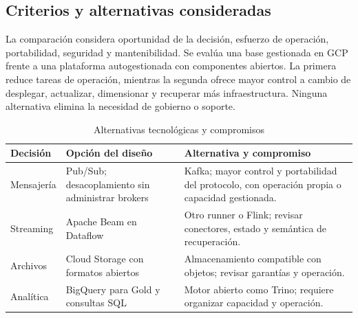 \documentclass[11pt,a4paper]{article}
\begin{document}
\subsection{Criterios y alternativas consideradas}
La comparación considera oportunidad de la decisión, esfuerzo de operación, portabilidad, seguridad y mantenibilidad. Se evalúa una base gestionada en GCP frente a una plataforma autogestionada con componentes abiertos. La primera reduce tareas de operación, mientras la segunda ofrece mayor control a cambio de desplegar, actualizar, dimensionar y recuperar más infraestructura. Ninguna alternativa elimina la necesidad de gobierno o soporte.
\begin{table}[H]
\caption{Alternativas tecnológicas y compromisos}\label{tab:alternativas}
\small\begin{tabularx}{\linewidth}{@{}P{.21\linewidth}YY@{}}\toprule
Decisión & Opción del diseño & Alternativa y compromiso\\\midrule
Mensajería & Pub/Sub; desacoplamiento sin administrar brokers & Kafka; mayor control y portabilidad del protocolo, con operación propia o capacidad gestionada.\\
Streaming & Apache Beam en Dataflow & Otro runner o Flink; revisar conectores, estado y semántica de recuperación.\\
Archivos & Cloud Storage con formatos abiertos & Almacenamiento compatible con objetos; revisar garantías y operación.\\
Analítica & BigQuery para Gold y consultas SQL & Motor abierto como Trino; requiere organizar capacidad y operación.\\\bottomrule
\end{tabularx}
\end{table}
\end{document}
